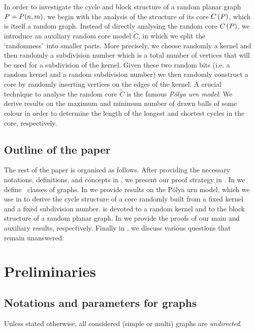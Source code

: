 In order to investigate the cycle and block structure of a random planar graph $P=P(n,m)$, we begin with the analysis of the structure of its core $C\left(P\right)$, which is itself a random graph. Instead of directly analysing the random core $C\left(P\right)$, we introduce an auxiliary random core model $\tilde C$, in which we split the \lq randomness\rq\ into smaller parts. More precisely, we choose randomly a kernel and then randomly a subdivision number which is a total number of vertices that will be used for a subdivision of the kernel. Given these two random bits (i.e. a random kernel and a random subdivision number) we then randomly construct a core by randomly inserting vertices on the edges of the kernel. A crucial technique to analyse the random core $\tilde C$ is the famous {\em P\'olya urn model}: 
We derive results on the maximum and minimum number of drawn balls of some colour in order to determine the length of the longest and shortest cycles in the core, respectively.

\subsection{Outline of the paper} 
The rest of the paper is organised as follows. After providing the necessary notations, definitions, and concepts in , we present our proof strategy in . In  we define \pl\ classes of graphs. In  we provide results on the P\'olya urn model, which we use in  to derive the cycle structure of a core randomly built from a fixed kernel and a fixed subdivision number.  is devoted to a random kernel and  to the block structure of a random planar graph. In  we provide the proofs of our main and auxiliary results, respectively. Finally in , we discuss various questions that remain unanswered.

\section{Preliminaries}\label{CBsec:prelim}

\subsection{Notations and parameters for graphs}
Unless stated otherwise, all considered (simple or multi) graphs are {\em undirected}.

